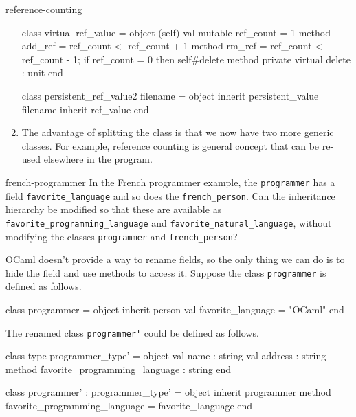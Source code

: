 \begin{exercise}{reference-counting}
\begin{answer}
\begin{enumerate}
\begin{ocaml}
class virtual ref_value =
object (self)
    val mutable ref_count = 1
    method add_ref = ref_count <- ref_count + 1
    method rm_ref =
       ref_count <- ref_count - 1;
       if ref_count = 0 then self#delete
    method private virtual delete : unit
end

class persistent_ref_value2 filename =
object
   inherit persistent_value filename
   inherit ref_value
end
\end{ocaml}

\item The advantage of splitting the class is that we now have two more generic classes.
For example, reference counting is general concept that can be re-used elsewhere in the program.
\end{enumerate}
\fi\end{answer}
\end{exercise}

%
\begin{exercise}{french-programmer}
In the French programmer example, the \hbox{\lstinline/programmer/} has a
field \hbox{\lstinline/favorite_language/} and so does
the \hbox{\lstinline/french_person/}.  Can the inheritance hierarchy be
modified so that these are available
as \hbox{\lstinline/favorite_programming_language/}
and \hbox{\lstinline/favorite_natural_language/}, without
modifying the classes \hbox{\lstinline/programmer/} and \hbox{\lstinline/french_person/}?

\begin{answer}\ifanswers
OCaml doesn't provide a way to rename fields, so the only thing we can
do is to hide the field and use methods to access it.  Suppose the
class \hbox{\lstinline/programmer/} is defined as follows.

\begin{ocaml}
class programmer =
object
   inherit person
   val favorite_language = "OCaml"
end
\end{ocaml}
%
The renamed class \hbox{\lstinline/programmer'/} could be defined as follows.

\begin{ocaml}
class type programmer_type' =
object
   val name : string
   val address : string
   method favorite_programming_language : string
end

class programmer' : programmer_type' =
object
   inherit programmer
   method favorite_programming_language = favorite_language
end
\end{ocaml}
\fi\end{answer}
\end{exercise}

